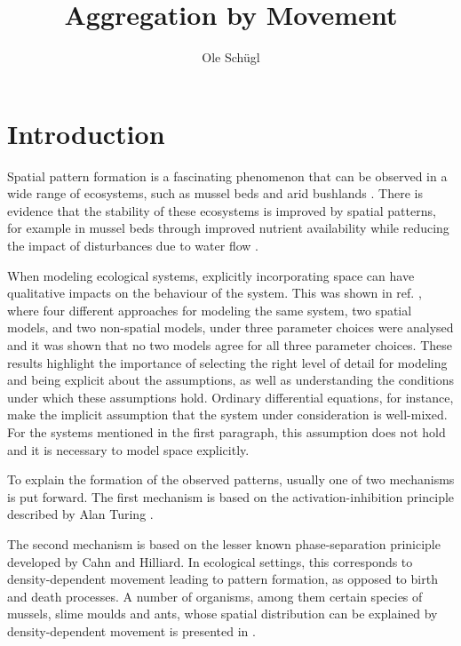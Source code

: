 \documentclass{article}
\title{Aggregation by Movement}
\author{Ole Schügl}
\begin{document}
\maketitle

\section{Introduction}
Spatial pattern formation is a fascinating phenomenon that can be observed in a wide range of ecosystems, such as mussel beds and arid bushlands \autocite{liuPhaseSeparationDriven2016,rietkerkSelfOrganizationVegetationArid}. 
There is evidence that the stability of these ecosystems is improved by spatial patterns, for example in mussel beds through improved nutrient availability while reducing the impact of disturbances due to water flow \autocite{vandekoppelExperimentalEvidenceSpatial2008}.

When modeling ecological systems, explicitly incorporating space can have qualitative impacts on the behaviour of the system. 
This was shown in ref. \cite{durrettImportanceBeingDiscrete1994}, where four different approaches for modeling the same system, two spatial models, and two non-spatial models, under three parameter choices were analysed and it was shown that no two models agree for all three parameter choices.
These results highlight the importance of selecting the right level of detail for modeling and being explicit about the assumptions, as well as understanding the conditions under which these assumptions hold.
Ordinary differential equations, for instance,  make the implicit assumption that the system under consideration is well-mixed. 
For the systems mentioned in the first paragraph, this assumption does not hold and it is necessary to model space explicitly.  

To explain the formation of the observed patterns, usually one of two mechanisms is put forward.
The first mechanism is based on the activation-inhibition principle described by Alan Turing \autocite{turingChemicalBasisMorphogenesis1952}.

The second mechanism is based on the lesser known phase-separation priniciple developed by Cahn and Hilliard. 
In ecological settings, this corresponds to density-dependent movement leading to pattern formation, as opposed to birth and death processes. A number of organisms, among them certain species of mussels, slime moulds and ants, whose spatial distribution can be explained by density-dependent movement is presented in \autocite{liuPhaseSeparationDriven2016}.
\end{document}
